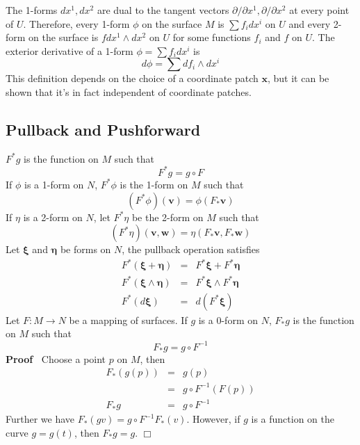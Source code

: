 \documentclass{article}
\newcommand{\tmmathbf}[1]{\ensuremath{\boldsymbol{#1}}}
\newenvironment{proof}{\noindent\textbf{Proof\ }}{\hspace*{\fill}$\Box$\medskip}
\begin{document}
The 1-forms $d x^1, d x^2$ are dual to the tangent vectors $\partial /
\partial x^1, \partial / \partial x^2$ at every point of $U$. Therefore, every
1-form $\phi$ on the surface $M$ is $\sum f_i d x^i$ on $U$ and every 2-form
on the surface is $f d x^1 \wedge d x^2$ on $U$ for some functions $f_i$ and
$f$ on $U$. The exterior derivative of a 1-form $\phi = \sum f_i d x^i$ is
\begin{equation}
  d \phi = \sum d f_i \wedge d x^i
\end{equation}
This definition depends on the choice of a coordinate patch $\mathbf{x}$, but
it can be shown that it's in fact independent of coordinate patches.

\subsection{Pullback and Pushforward}

$F^{\ast} g$ is the function on $M$ such that
\begin{equation}
  F^{\ast} g = g \circ F
\end{equation}
If $\phi$ is a 1-form on $N$, $F^{\ast} \phi$ is the 1-form on $M$ such that
\begin{equation}
  (F^{\ast} \phi) (\tmmathbf{v}) = \phi (F_{\ast} \tmmathbf{v})
\end{equation}
If $\eta$ is a 2-form on $N$, let $F^{\ast} \eta$ be the 2-form on $M$ such
that
\begin{equation}
  (F^{\ast} \eta) (\tmmathbf{v}, \tmmathbf{w}) = \eta (F_{\ast} \tmmathbf{v},
  F_{\ast} \tmmathbf{w})
\end{equation}
Let $\tmmathbf{\xi}$ and $\tmmathbf{\eta}$ be forms on $N$, the pullback
operation satisfies
\begin{eqnarray*}
  F^{\ast} (\tmmathbf{\xi}+\tmmathbf{\eta}) & = & F^{\ast} \tmmathbf{\xi}+
  F^{\ast} \tmmathbf{\eta}\\
  F^{\ast} (\tmmathbf{\xi} \wedge \tmmathbf{\eta}) & = & F^{\ast}
  \tmmathbf{\xi} \wedge F^{\ast} \tmmathbf{\eta}\\
  F^{\ast} (d\tmmathbf{\xi}) & = & d (F^{\ast} \tmmathbf{\xi})
\end{eqnarray*}
Let $F : M \rightarrow N$ be a mapping of surfaces. If $g$ is a 0-form on $N$,
$F_{\ast} g$ is the function on $M$ such that
\begin{equation}
  F_{\ast} g = g \circ F^{- 1}
\end{equation}
\begin{proof}
  Choose a point $p$ on $M$, then
  \begin{eqnarray*}
    F_{\ast} (g (p)) & = & g (p)\\
    & = & g \circ F^{- 1} (F (p))\\
    F_{\ast} g & = & g \circ F^{- 1}
  \end{eqnarray*}
  Further we have $F_{\ast} (g v) = g \circ F^{- 1} F_{\ast} (v)$. However, if
  $g$ is a function on the curve $g = g (t)$, then $F_{\ast} g = g$.
\end{proof}
\end{document}
